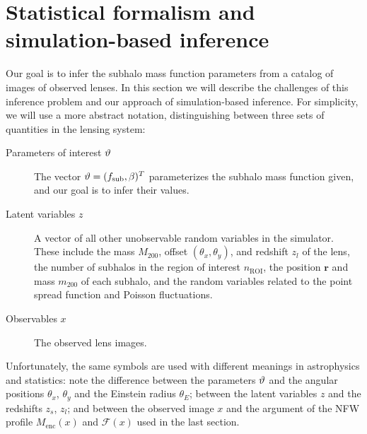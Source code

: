 \documentclass[twocolumn]{aastex62}
\begin{document}
\section{Statistical formalism and simulation-based inference}
\label{sec:lfi-formalism}
%
Our goal is to infer the subhalo mass function parameters from a catalog of images of observed lenses. In this section we will describe the challenges of this inference problem and our approach of simulation-based inference. For simplicity, we will use a more abstract notation, distinguishing between three sets of quantities in the lensing system:
%
\begin{description}
  \item[Parameters of interest $\vartheta$] The vector $\vartheta = (f_{\mathrm{sub}}, \beta)^T$ parameterizes the subhalo mass function given, and our goal is to infer their values.
  \item[Latent variables $z$] A vector of all other unobservable random variables in the simulator. These include the mass $M_{200}$, offset $(\theta_x, \theta_y)$, and redshift $z_l$ of the lens, the number of subhalos in the region of interest $n_\mathrm{ROI}$, the position $\mathbf{r}$ and mass $m_{200}$ of each subhalo, and the random variables related to the point spread function and Poisson fluctuations.
  \item[Observables $x$] The observed lens images.
\end{description}
%
Unfortunately, the same symbols are used with different meanings in astrophysics and statistics: note the difference between the parameters $\vartheta$ and the angular positions $\theta_x$, $\theta_y$ and the Einstein radius $\theta_E$; between the latent variables $z$ and the redshifts $z_s$, $z_l$; and between the observed image $x$ and the argument of the NFW profile $M_\mathrm{enc}(x)$ and $\mathcal F(x)$ used in the last section.
\end{document}
